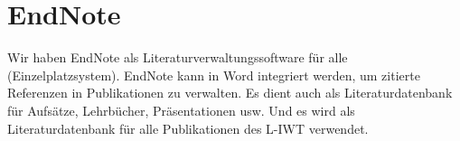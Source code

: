 \section{EndNote}

Wir haben EndNote als Literaturverwaltungssoftware für alle
(Einzelplatzsystem). EndNote kann in Word integriert werden, um zitierte
Referenzen in Publikationen zu verwalten. Es dient auch als Literaturdatenbank
für Aufsätze, Lehrbücher, Präsentationen usw. Und es wird als Literaturdatenbank
für alle Publikationen des L-IWT verwendet.
